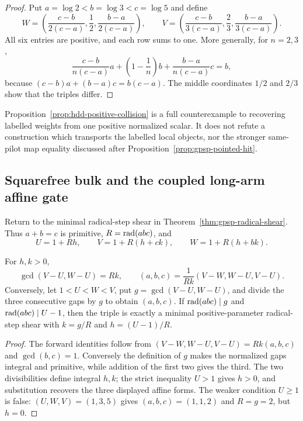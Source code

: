 \begin{proof}
Put $a=\log2<b=\log3<c=\log5$ and define
\[
 W=\left(\frac{c-b}{2(c-a)},\frac12,
          \frac{b-a}{2(c-a)}\right),\qquad
 V=\left(\frac{c-b}{3(c-a)},\frac23,
          \frac{b-a}{3(c-a)}\right).
\]
All six entries are positive, and each row sums to one.  More generally, for
$n=2,3$,
\[
 \frac{c-b}{n(c-a)}a+\left(1-\frac1n\right)b
       +\frac{b-a}{n(c-a)}c=b,
\]
because $(c-b)a+(b-a)c=b(c-a)$.  The middle coordinates $1/2$ and $2/3$
show that the triples differ.
\end{proof}

Proposition~\ref{prop:hdd-positive-collision} is a full counterexample to
recovering labelled weights from one positive normalized scalar.  It does
not refute a construction which transports the labelled local objects, nor
the stronger same-pilot map equality discussed after
Proposition~\ref{prop:gpsp-pointed-hit}.

\subsection{Squarefree bulk and the coupled long-arm affine gate}

Return to the minimal radical-step shear in
Theorem~\ref{thm:gpsp-radical-shear}.  Thus $a+b=c$ is primitive,
$R=\operatorname{rad}(abc)$, and
\[
 U=1+Rh,\qquad V=1+R(h+ck),\qquad W=1+R(h+bk).
\]

\begin{proposition}
\label{prop:hdd-gap-recovery}
For $h,k>0$,
\[
 \gcd(V-U,W-U)=Rk,
 \qquad
 (a,b,c)=\frac1{Rk}(V-W,W-U,V-U).
\]
Conversely, let $1<U<W<V$, put $g=\gcd(V-U,W-U)$, and divide the
three consecutive gaps by $g$ to obtain $(a,b,c)$.  If
$\operatorname{rad}(abc)\mid g$ and $\operatorname{rad}(abc)\mid U-1$, then the triple is exactly a
minimal positive-parameter radical-step shear with $k=g/R$ and
$h=(U-1)/R$.
\end{proposition}

\begin{proof}
The forward identities follow from
$(V-W,W-U,V-U)=Rk(a,b,c)$ and $\gcd(b,c)=1$.  Conversely the definition of
$g$ makes the normalized gaps integral and primitive, while addition of the
first two gives the third.  The two divisibilities define integral $h,k$;
the strict inequality $U>1$ gives $h>0$, and substitution recovers the
three displayed affine forms.  The weaker condition $U\geq1$ is false:
$(U,W,V)=(1,3,5)$ gives $(a,b,c)=(1,1,2)$ and $R=g=2$, but $h=0$.
\end{proof}

